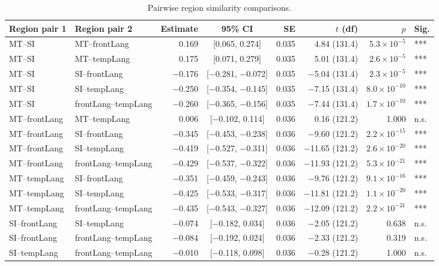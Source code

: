 \begin{table}[h]
\centering
\begin{tabular}{llrcrrrl}
\toprule
Region pair 1 & Region pair 2 & Estimate & 95\% CI & SE & $t$ (df) & $p$ & Sig. \\
\midrule
MT--SI & MT--frontLang & 0.169 & [0.065, 0.274] & 0.035 & 4.84 (131.4) & $5.3\times10^{-5}$ & *** \\
MT--SI & MT--tempLang & 0.175 & [0.071, 0.279] & 0.035 & 5.01 (131.4) & $2.6\times10^{-5}$ & *** \\
MT--SI & SI--frontLang & $-$0.176 & [$-$0.281, $-$0.072] & 0.035 & $-$5.04 (131.4) & $2.3\times10^{-5}$ & *** \\
MT--SI & SI--tempLang & $-$0.250 & [$-$0.354, $-$0.145] & 0.035 & $-$7.15 (131.4) & $8.0\times10^{-10}$ & *** \\
MT--SI & frontLang--tempLang & $-$0.260 & [$-$0.365, $-$0.156] & 0.035 & $-$7.44 (131.4) & $1.7\times10^{-10}$ & *** \\
MT--frontLang & MT--tempLang & 0.006 & [$-$0.102, 0.114] & 0.036 & 0.16 (121.2) & 1.000 & n.s. \\
MT--frontLang & SI--frontLang & $-$0.345 & [$-$0.453, $-$0.238] & 0.036 & $-$9.60 (121.2) & $2.2\times10^{-15}$ & *** \\
MT--frontLang & SI--tempLang & $-$0.419 & [$-$0.527, $-$0.311] & 0.036 & $-$11.65 (121.2) & $2.6\times10^{-20}$ & *** \\
MT--frontLang & frontLang--tempLang & $-$0.429 & [$-$0.537, $-$0.322] & 0.036 & $-$11.93 (121.2) & $5.3\times10^{-21}$ & *** \\
MT--tempLang & SI--frontLang & $-$0.351 & [$-$0.459, $-$0.243] & 0.036 & $-$9.76 (121.2) & $9.1\times10^{-16}$ & *** \\
MT--tempLang & SI--tempLang & $-$0.425 & [$-$0.533, $-$0.317] & 0.036 & $-$11.81 (121.2) & $1.1\times10^{-20}$ & *** \\
MT--tempLang & frontLang--tempLang & $-$0.435 & [$-$0.543, $-$0.327] & 0.036 & $-$12.09 (121.2) & $2.2\times10^{-21}$ & *** \\
SI--frontLang & SI--tempLang & $-$0.074 & [$-$0.182, 0.034] & 0.036 & $-$2.05 (121.2) & 0.638 & n.s. \\
SI--frontLang & frontLang--tempLang & $-$0.084 & [$-$0.192, 0.024] & 0.036 & $-$2.33 (121.2) & 0.319 & n.s. \\
SI--tempLang & frontLang--tempLang & $-$0.010 & [$-$0.118, 0.098] & 0.036 & $-$0.28 (121.2) & 1.000 & n.s. \\
\bottomrule
\end{tabular}
\caption{Pairwise region similarity comparisons.}
\end{table}
